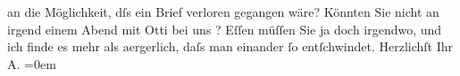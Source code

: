 \begin{ledgroupsized}[t]{13cm}
               an die Möglichkeit, dſs ein {\pb}Brief verloren
               gegangen wäre?\pend
           \pstart
           Könnten Sie nicht an irgend einem Abend mit Otti bei uns \label{K_L02986-2v}\label{K_L02986-2h}?
               Eſſen müſſen Sie ja doch irgendwo, und ich finde es mehr als aergerlich, {\pb}daſs man einander ſo entſchwindet.\pend
           \pstart
           Herzlichſt Ihr {\\[\baselineskip]}\spacefill\mbox{A.}\pend
           \leftskip=0em{}
         
         \endnumbering{}\end{ledgroupsized}  \newcommand{\dateiname}{L02986}\newcommand{\titel}{Arthur Schnitzler an Felix Salten, [12. 10. 1903?]}\newcommand{\editorInnen}{Martin Anton Müller und Laura Untner}
      